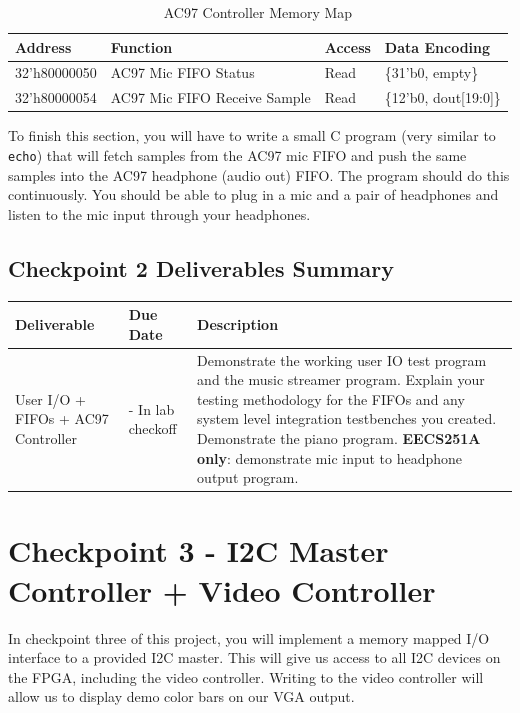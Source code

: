 \documentclass[11pt]{article}
\begin{document}
\begin{table}[hbt]
	\begin{center}
		\caption{AC97 Controller Memory Map}
		\begin{tabular}{l l l l}
			\toprule
			\textbf{Address} & \textbf{Function} & \textbf{Access} & \textbf{Data Encoding}\\
			\midrule
			32'h80000050 & AC97 Mic FIFO Status & Read & \{31'b0, empty\} \\
			32'h80000054 & AC97 Mic FIFO Receive Sample & Read & \{12'b0, dout[19:0]\} \\
			\bottomrule
		\end{tabular}
	\end{center}
\end{table}

To finish this section, you will have to write a small C program (very similar to \verb|echo|) that will fetch samples from the AC97 mic FIFO and push the same samples into the AC97 headphone (audio out) FIFO. The program should do this continuously. You should be able to plug in a mic and a pair of headphones and listen to the mic input through your headphones.

\subsection{Checkpoint 2 Deliverables Summary}

\begin{center}
	\begin{tabular}{m{30mm} m{35mm} m{70mm}}
		\toprule
		\textbf{Deliverable} & \textbf{Due Date} & \textbf{Description} \\
		\midrule
		User I/O + FIFOs + AC97 Controller & \audioDueDate \space - In lab checkoff & Demonstrate the working user IO test program and the music streamer program. Explain your testing methodology for the FIFOs and any system level integration testbenches you created. Demonstrate the piano program. \textbf{EECS251A only}: demonstrate mic input to headphone output program. \\
		\bottomrule
	\end{tabular}
\end{center}

\pagebreak

\section{Checkpoint 3 - I2C Master Controller + Video Controller}
In checkpoint three of this project, you will implement a memory mapped I/O interface to a provided I2C master. This will give us access to all I2C devices on the FPGA, including the video controller. Writing to the video controller will allow us to display demo color bars on our VGA output.
\end{document}
